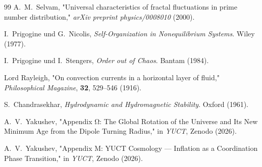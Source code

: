 \documentclass[11pt,a4paper]{article}
\begin{document}
\begin{thebibliography}{99}
		A.~M.~Selvam, "Universal characteristics of fractal fluctuations in prime number distribution," \emph{arXiv preprint physics/0008010} (2000).
		
		I.~Prigogine und G.~Nicolis, \emph{Self-Organization in Nonequilibrium Systems}. Wiley (1977).
		
		I.~Prigogine und I.~Stengers, \emph{Order out of Chaos}. Bantam (1984).
		
		Lord Rayleigh, "On convection currents in a horizontal layer of fluid," \emph{Philosophical Magazine}, \textbf{32}, 529--546 (1916).
		
		S.~Chandrasekhar, \emph{Hydrodynamic and Hydromagnetic Stability}. Oxford (1961).
		
		A.~V.~Yakushev, "Appendix Ω: The Global Rotation of the Universe and Its New Minimum Age from the Dipole Turning Radius," in \emph{YUCT}, Zenodo (2026).
		
		A.~V.~Yakushev, "Appendix M: YUCT Cosmology — Inflation as a Coordination Phase Transition," in \emph{YUCT}, Zenodo (2026).
		
	\end{thebibliography}
	
\end{document}
